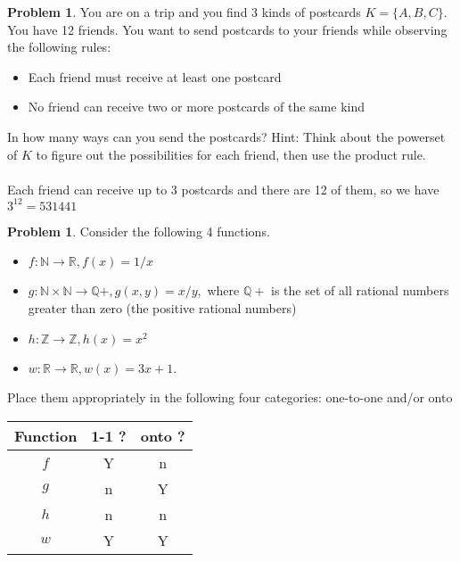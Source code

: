 \documentclass[10pt,leqno ]{article}
\theoremstyle{definition}
\newtheorem{problem}[theorem]{Problem}
\begin{document}
\begin{problem} You are on a trip and you find 3 kinds of postcards $K=\{A, B, C\}$.  You have 12 friends.  You want to send postcards to your friends while observing the following rules:
\begin{itemize}
\item Each friend must receive at least one postcard\\
\item No friend can receive two or more postcards of the same kind
\end{itemize}
In how many ways can you send the postcards?  Hint:  Think about the powerset of $K$ to figure out the possibilities for each friend, then use the product rule.
\Large
\\\\
Each friend can receive up to 3 postcards and there are 12 of them, so we have $3^{12} = 531441$
\end{problem}
\newpage

\begin{problem} Consider the following 4 functions.
\begin{itemize}
\item $f:\mathbb{N} \to \mathbb{R} ,f(x) = 1/x$\\
\item $g:\mathbb{N} \times \mathbb{N} \to \mathbb{Q}+,g(x, y) =x/y,$ where $\mathbb{Q}+$ is the set of all rational numbers greater than zero (the positive rational numbers)\\
\item $h:\mathbb{Z} \to \mathbb{Z} ,h(x) = x^2$\\
\item $w:\mathbb{R} \to \mathbb{R}, w(x) = 3x+ 1$.
\end{itemize}
Place them appropriately in the following four categories:  one-to-one and/or onto
\\
\Large

\begin{table}[H]
\begin{tabular}{|c|c|c|}
\hline
Function & 1-1 ? & onto ? \\ \hline
$f$ & Y & n \\ \hline
$g$ & n & Y \\ \hline
$h$ & n &  n\\ \hline
$w$ & Y &  Y\\ \hline
\end{tabular}
\end{table}

\end{problem}
\end{document}
